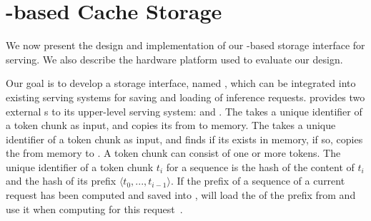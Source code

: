 


\section{\cxl-based \kv Cache Storage}
\label{sec:implementation}



We now present the design and implementation of our \cxl-based \kvcache storage interface for \llm serving. We also describe the hardware platform used to evaluate our design.

 Our goal is to develop a \cxl storage interface, named \tool, which can be integrated into existing \llm serving systems for saving and loading \kvcache of inference requests.
\tool provides two external \api{}s to its upper-level serving system: \apisave and \apiload. 
The \apisave takes a unique identifier of a token chunk as input, and copies its \kvcache from \gpu to \cxl memory. 
The \apiload takes a unique identifier of a token chunk as input, and finds if its  \kvcache exists in \cxl memory, if so, copies the \kvcache from \cxl memory to \gpu. A token chunk can consist of one or more tokens.
The unique identifier of a token chunk $t_i$ for a sequence is the hash of the content of $t_i$ and the hash of its prefix $\langle t_0,...,t_{i-1}\rangle$. If the prefix of a sequence of a current request has been computed and saved into \cxl, \tool will load the \kvcache of the prefix from \cxl and use it when computing for this request~\cite{pagedattenion}. 

